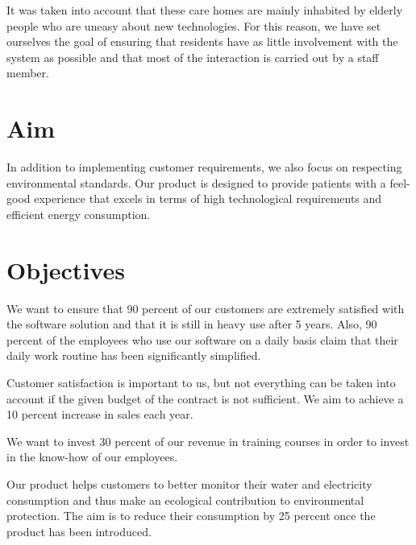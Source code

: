 It was taken into account that these care homes are mainly inhabited by elderly
people who are uneasy about new technologies. For this reason, we have set
ourselves the goal of ensuring that residents have as little involvement with
the system as possible and that most of the interaction is carried out by a
staff member.


\section{Aim}
\label{sec:orgaba15cc}
In addition to implementing customer requirements, we also focus on respecting
environmental standards. Our product is designed to provide patients with a
feel-good experience that excels in terms of high technological requirements and
efficient energy consumption.

\section{Objectives}
\label{sec:orgff22d59}


We want to ensure that 90 percent of our customers are extremely satisfied with
the software solution and that it is still in heavy use after 5 years. Also, 90
percent of the employees who use our software on a daily basis claim that their
daily work routine has been significantly simplified.

Customer satisfaction is important to us, but not everything can be taken into
account if the given budget of the contract is not sufficient. We aim to achieve
a 10 percent increase in sales each year.

We want to invest 30 percent of our revenue in training courses in order to
invest in the know-how of our employees.

Our product helps customers to better monitor their water and electricity
consumption and thus make an ecological contribution to environmental
protection. The aim is to reduce their consumption by 25 percent once the
product has been introduced.

